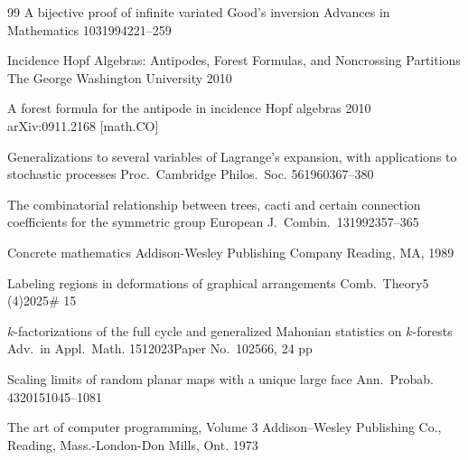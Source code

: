 \documentclass[11pt]{amsart}
\numberwithin{equation}{section}
\begin{document}
\begin{thebibliography}{99}
            {A bijective proof of infinite variated Good's inversion}
            {Advances in Mathematics}
            {103}{1994}{221--259}

           {Incidence Hopf Algebras: Antipodes, Forest Formulas,
             and Noncrossing Partitions}
           {The George Washington University}
           {2010}

              {A forest formula for the antipode in incidence Hopf algebras}
              {2010}
              arXiv:0911.2168 [math.CO]

            {Generalizations to several variables of Lagrange's expansion,
             with applications to stochastic processes}
            {Proc.\ Cambridge Philos.\ Soc.}
            {56}{1960}{367--380}

            {The combinatorial relationship between trees, cacti and
              certain connection coefficients for the symmetric group}
            {European J.\ Combin.\ }{13}{1992}{357--365}
            
         {Concrete mathematics}
         {Addison-Wesley Publishing Company}
         {Reading, MA, 1989}

        {Labeling regions in deformations of graphical arrangements}
        {Comb.\ Theory}{5 (4)}{2025}{\# 15}

            {$k$-factorizations of the full cycle and generalized Mahonian
             statistics on $k$-forests}      
            {Adv.\ in Appl.\ Math.}
            {151}{2023}{Paper No.\ 102566, 24 pp}

              {Scaling limits of random planar maps with a unique large face}
              {Ann.\ Probab.\ }
              {43}{2015}{1045--1081}

              
         {The art of computer programming, Volume 3}
         {Addison--Wesley Publishing Co., Reading, Mass.-London-Don Mills, Ont.}
         {1973}
              

\end{thebibliography}
\end{document}

